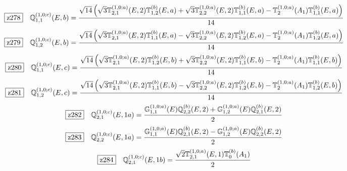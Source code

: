 \documentclass[fleqn,10pt,landscape]{jsarticle}
\begin{document}
\begin{dmath*}
\hspace*{3mm}\fbox{z278}\quad \mathbb{Q}_{1,1}^{(1,0;c)}(E,b)=\frac{\sqrt{14} \left(\sqrt{3} \mathbb{T}_{2,1}^{(1,0;a)}(E,2) \mathbb{T}_{1,2}^{(b)}(E,a) + \sqrt{3} \mathbb{T}_{2,2}^{(1,0;a)}(E,2) \mathbb{T}_{1,1}^{(b)}(E,a) - \mathbb{T}_{2}^{(1,0;a)}(A_{1}) \mathbb{T}_{1,1}^{(b)}(E,a)\right)}{14}
\end{dmath*}
\begin{dmath*}
\hspace*{3mm}\fbox{z279}\quad \mathbb{Q}_{1,2}^{(1,0;c)}(E,b)=\frac{\sqrt{14} \left(\sqrt{3} \mathbb{T}_{2,1}^{(1,0;a)}(E,2) \mathbb{T}_{1,1}^{(b)}(E,a) - \sqrt{3} \mathbb{T}_{2,2}^{(1,0;a)}(E,2) \mathbb{T}_{1,2}^{(b)}(E,a) - \mathbb{T}_{2}^{(1,0;a)}(A_{1}) \mathbb{T}_{1,2}^{(b)}(E,a)\right)}{14}
\end{dmath*}
\begin{dmath*}
\hspace*{3mm}\fbox{z280}\quad \mathbb{Q}_{1,1}^{(1,0;c)}(E,c)=\frac{\sqrt{14} \left(\sqrt{3} \mathbb{T}_{2,1}^{(1,0;a)}(E,2) \mathbb{T}_{1,2}^{(b)}(E,b) + \sqrt{3} \mathbb{T}_{2,2}^{(1,0;a)}(E,2) \mathbb{T}_{1,1}^{(b)}(E,b) - \mathbb{T}_{2}^{(1,0;a)}(A_{1}) \mathbb{T}_{1,1}^{(b)}(E,b)\right)}{14}
\end{dmath*}
\begin{dmath*}
\hspace*{3mm}\fbox{z281}\quad \mathbb{Q}_{1,2}^{(1,0;c)}(E,c)=\frac{\sqrt{14} \left(\sqrt{3} \mathbb{T}_{2,1}^{(1,0;a)}(E,2) \mathbb{T}_{1,1}^{(b)}(E,b) - \sqrt{3} \mathbb{T}_{2,2}^{(1,0;a)}(E,2) \mathbb{T}_{1,2}^{(b)}(E,b) - \mathbb{T}_{2}^{(1,0;a)}(A_{1}) \mathbb{T}_{1,2}^{(b)}(E,b)\right)}{14}
\end{dmath*}
\begin{dmath*}
\hspace*{3mm}\fbox{z282}\quad \mathbb{Q}_{2,1}^{(1,0;c)}(E,1a)=\frac{\mathbb{G}_{1,1}^{(1,0;a)}(E) \mathbb{Q}_{2,2}^{(b)}(E,2) + \mathbb{G}_{1,2}^{(1,0;a)}(E) \mathbb{Q}_{2,1}^{(b)}(E,2)}{2}
\end{dmath*}
\begin{dmath*}
\hspace*{3mm}\fbox{z283}\quad \mathbb{Q}_{2,2}^{(1,0;c)}(E,1a)=\frac{\mathbb{G}_{1,1}^{(1,0;a)}(E) \mathbb{Q}_{2,1}^{(b)}(E,2) - \mathbb{G}_{1,2}^{(1,0;a)}(E) \mathbb{Q}_{2,2}^{(b)}(E,2)}{2}
\end{dmath*}
\begin{dmath*}
\hspace*{3mm}\fbox{z284}\quad \mathbb{Q}_{2,1}^{(1,0;c)}(E,1b)=\frac{\sqrt{2} \mathbb{T}_{2,1}^{(1,0;a)}(E,1) \mathbb{T}_{0}^{(b)}(A_{1})}{2}
\end{dmath*}
\end{document}
